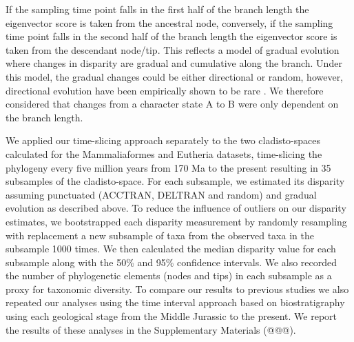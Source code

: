 \documentclass[12pt,letterpaper]{article}
\begin{document}
\begin{enumerate}
    If the sampling time point falls in the first half of the branch length the eigenvector score is taken from the ancestral node, conversely, if the sampling time point falls in the second half of the branch length the eigenvector score is taken from the descendant node/tip.
    This reflects a model of gradual evolution where changes in disparity are gradual and cumulative along the branch.
    Under this model, the gradual changes could be either directional or random, however, directional evolution have been empirically shown to be rare \citep[only 5\% of the time][]{Hunt20112007}.
    We therefore considered that changes from a character state A to B were only dependent on the branch length.
\end{enumerate}
We applied our time-slicing approach separately to the two cladisto-spaces calculated for the Mammaliaformes and Eutheria datasets, time-slicing the phylogeny every five million years from 170 Ma to the present resulting in 35 subsamples of the cladisto-space.
For each subsample, we estimated its disparity assuming punctuated (ACCTRAN, DELTRAN and random) and gradual evolution as described above.
To reduce the influence of outliers on our disparity estimates, we bootstrapped each disparity measurement by randomly resampling with replacement a new subsample of taxa from the observed taxa in the subsample 1000 times.
We then calculated the median disparity value for each subsample along with the 50\% and 95\% confidence intervals.
We also recorded the number of phylogenetic elements (nodes and tips) in each subsample as a proxy for taxonomic diversity.
To compare our results to previous studies we also repeated our analyses using the time interval approach based on biostratigraphy \citep[e.g.][]{cisneros2010,prentice2011,Hughes20082013,bentonmodels2014} using each geological stage from the Middle Jurassic to the present.
We report the results of these analyses in the Supplementary Materials (@@@). %

\end{document}
